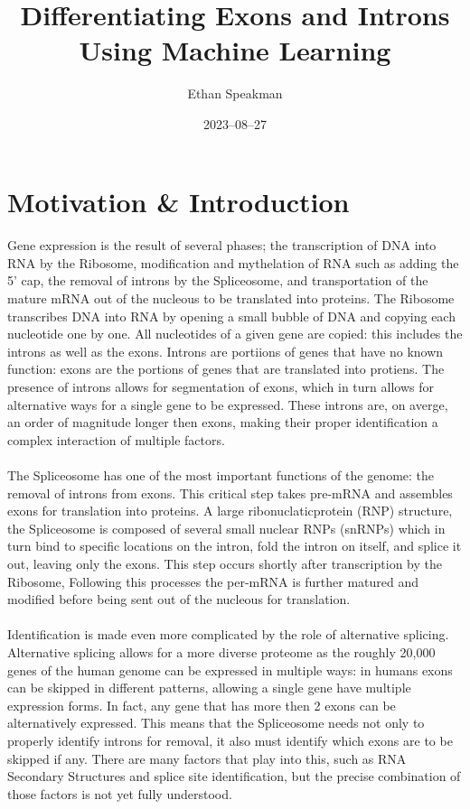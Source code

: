 \documentclass[12pt]{article}
\title{Differentiating Exons and Introns Using Machine Learning}
\author{Ethan Speakman}
\date{2023–08–27}
\begin{document}
\maketitle

\section{Motivation \& Introduction}
\paragraph*{}
Gene expression is the result of several phases; the transcription of DNA into RNA by the Ribosome, modification and mythelation of RNA such as adding the 5' cap, the removal of introns by the Spliceosome, and transportation of the mature mRNA out of the nucleous to be translated into proteins\cite{covelo2018rna}.
The Ribosome transcribes DNA into RNA by opening a small bubble of DNA and copying each nucleotide one by one.
All nucleotides of a given gene are copied: this includes the introns as well as the exons.
Introns are portiions of genes that have no known function: exons are the portions of genes that are translated into protiens.
The presence of introns allows for segmentation of exons, which in turn allows for alternative ways for a single gene to be expressed.
These introns are, on averge, an order of magnitude longer then exons, making their proper identification a complex interaction of multiple factors.
\paragraph*{}
The Spliceosome has one of the most important functions of the genome: the removal of introns from exons. 
This critical step takes pre-mRNA and assembles exons for translation into proteins. 
A large ribonuclaticprotein (RNP) structure, the Spliceosome is composed of several small nuclear RNPs (snRNPs) which in turn bind to specific locations on the intron, fold the intron on itself, and splice it out, leaving only the exons\cite{will2011spliceosome}\cite{matera2014day}.
This step occurs shortly after transcription by the Ribosome, 
Following this processes the per-mRNA is further matured and modified before being sent out of the nucleous for translation.
\paragraph*{}
Identification is made even more complicated by the role of alternative splicing.
Alternative splicing allows for a more diverse proteome as the roughly 20,000 genes of the human genome can be expressed in multiple ways: in humans exons can be skipped in different patterns, allowing a single gene have multiple expression forms.
In fact, any gene that has more then 2 exons can be alternatively expressed.
This means that the Spliceosome needs not only to properly identify introns for removal, it also must identify which exons are to be skipped if any.
There are many factors that play into this, such as RNA Secondary Structures and splice site identification, but the precise combination of those factors is not yet fully understood.
\end{document}
